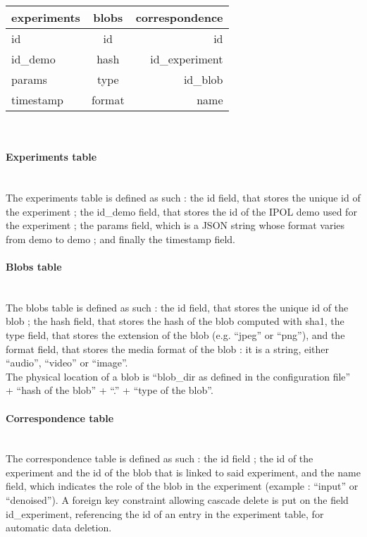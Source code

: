 \begin{tabular}{|l|c|r|}
  \hline
  experiments & blobs & correspondence \\
  \hline
  id & id & id \\
  id\_demo & hash & id\_experiment \\
  params & type & id\_blob \\
  timestamp & format & name \\
  \hline
\end{tabular} \\

\paragraph{Experiments table} \hspace{0pt} \\
The experiments table is defined as such : the id field, that stores the unique id of the experiment ; the id\_demo field, that stores the id of the IPOL demo used for the experiment ; the params field, which is a JSON string whose format varies from demo to demo ; and finally the timestamp field.

\paragraph{Blobs table} \hspace{0pt} \\
The blobs table is defined as such : the id field, that stores the unique id of the blob ; the hash field, that stores the hash of the blob computed with sha1, the type field, that stores the extension of the blob (e.g. ``jpeg'' or ``png''), and the format field, that stores the media format of the blob : it is a string, either ``audio'', ``video'' or ``image''. \\
The physical location of a blob is ``blob\_dir as defined in the configuration file'' + ``hash of the blob'' + ``.'' + ``type of the blob''.

\paragraph{Correspondence table} \hspace{0pt} \\
The correspondence table is defined as such : the id field ; the id of the experiment and the id of the blob that is linked to said experiment, and the name field, which indicates the role of the blob in the experiment (example : ``input'' or ``denoised''). A foreign key constraint allowing cascade delete is put on the field id\_experiment, referencing the id of an entry in the experiment table, for automatic data deletion.

